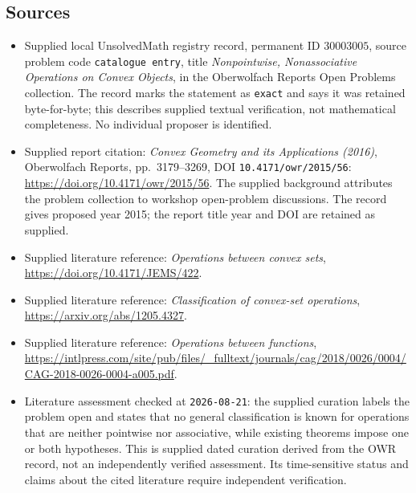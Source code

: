 \documentclass[11pt]{article}
\begin{document}
\subsection{Sources}
\begin{itemize}
\item Supplied local UnsolvedMath registry record, permanent ID \(30003005\), source problem code \texttt{catalogue entry}, title \emph{Nonpointwise, Nonassociative Operations on Convex Objects}, in the Oberwolfach Reports Open Problems collection. The record marks the statement as \texttt{exact} and says it was retained byte-for-byte; this describes supplied textual verification, not mathematical completeness. No individual proposer is identified.
\item Supplied report citation: \emph{Convex Geometry and its Applications (2016)}, Oberwolfach Reports, pp.\ 3179--3269, DOI \texttt{10.4171/owr/2015/56}: \url{https://doi.org/10.4171/owr/2015/56}. The supplied background attributes the problem collection to workshop open-problem discussions. The record gives proposed year 2015; the report title year and DOI are retained as supplied.
\item Supplied literature reference: \emph{Operations between convex sets}, \url{https://doi.org/10.4171/JEMS/422}.
\item Supplied literature reference: \emph{Classification of convex-set operations}, \url{https://arxiv.org/abs/1205.4327}.
\item Supplied literature reference: \emph{Operations between functions}, \url{https://intlpress.com/site/pub/files/_fulltext/journals/cag/2018/0026/0004/CAG-2018-0026-0004-a005.pdf}.
\item Literature assessment checked at \texttt{2026-08-21}: the supplied curation labels the problem open and states that no general classification is known for operations that are neither pointwise nor associative, while existing theorems impose one or both hypotheses. This is supplied dated curation derived from the OWR record, not an independently verified assessment. Its time-sensitive status and claims about the cited literature require independent verification.
\end{itemize}
\end{document}

